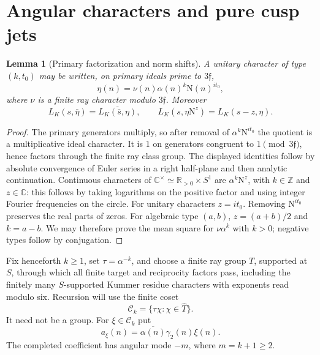 \documentclass[11pt,a4paper]{article}
\numberwithin{equation}{section}
\newtheorem{lemma}[theorem]{Lemma}
\theoremstyle{definition}
\theoremstyle{remark}
\newcommand{\C}{\mathbb C}
\newcommand{\R}{\mathbb R}
\newcommand{\Z}{\mathbb Z}
\newcommand{\N}{\mathrm N}
\begin{document}
\section{Angular characters and pure cusp jets}\label{sec:jet}
\begin{lemma}[Primary factorization and norm shifts]\label{lem:factor}
A unitary character of type $(k,t_0)$ may be written, on primary ideals prime to $3\mathfrak f$,
\[
 \eta(n)=\nu(n)\alpha(n)^k\N(n)^{it_0},
\]
where $\nu$ is a finite ray character modulo $3\mathfrak f$. Moreover
\[
 L_K(s,\bar\eta)=\overline{L_K(\bar s,\eta)},\qquad
 L_K(s,\eta\N^z)=L_K(s-z,\eta).
\]
\end{lemma}
\begin{proof}
The primary generators multiply, so after removal of $\alpha^k\N^{it_0}$ the quotient is a multiplicative ideal character. It is $1$ on generators congruent to $1\pmod{3\mathfrak f}$, hence factors through the finite ray class group. The displayed identities follow by absolute convergence of Euler series in a right half-plane and then analytic continuation. Continuous characters of $\C^\times\simeq\R_{>0}\times S^1$ are $\alpha^k\N^z$, with $k\in\Z$ and $z\in\C$: this follows by taking logarithms on the positive factor and using integer Fourier frequencies on the circle. For unitary characters $z=it_0$. Removing $\N^{it_0}$ preserves the real parts of zeros. For algebraic type $(a,b)$, $z=(a+b)/2$ and $k=a-b$. We may therefore prove the mean square for $\nu\alpha^k$ with $k>0$; negative types follow by conjugation.
\end{proof}

Fix henceforth $k\ge1$, set $\tau=\alpha^{-k}$, and choose a finite ray group $T$, supported at $S$, through which all finite target and reciprocity factors pass, including the finitely many $S$-supported Kummer residue characters with exponents read modulo six. Recursion will use the finite coset
\[
 \mathscr C_k=\{\tau\chi:\chi\in\widehat T\}.
\]
It need not be a group. For $\xi\in\mathscr C_k$ put
\begin{equation}\label{eq:axi}
 a_\xi(n)=\overline{\alpha(n)}\gamma_2(n)\xi(n).
\end{equation}
The completed coefficient has angular mode $-m$, where $m=k+1\ge2$.
\end{document}
